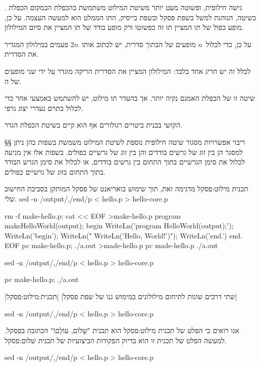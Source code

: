 גישה חילופית, ופשוטה מעט יותר משיטת המילוט משתמשת בהכפלת ה במקום הכפלת
. בשיטה, הנוהגת למשל בשפת פסקל ובשפת בייסיק,
התו הממלט הוא למעשה ה עצמה. על כן, מופע כפול של תו ה מציין תו זה כפשוטו ורק מופע בודד של תו ה מציין את
סיום המילולון.

על כן, כדי לכלול~$n$ מופעים של ה בתוך סדרית, יש לכתוב
אותו~$2n$ פעמים במילולון המגדיר את הסדרית.

לכלל זה יש חריג אחד בלבד:
המילולון המציין את הסדרית הריקה מוגדר על ידי שני מופעים של ה.

שיטה זו של הכפלת ה אמנם נקיה יותר, אך בהעדר תו מילוט, יש
להשתמש באמצעי אחר כדי לכלול ב תוים נעדרי יצוג גרפי.

הקושי בבנית ביטויים רגולורים אף הוא קיים בשיטת הכפלת הגדר.

§§ ריבוי אפשרויות מסגור
שיטה חילופית נוספת לשיטת המילוט משמשת בשפות בהן ניתן למסגר  הן בין זוג
של גרשים בודדים והן בין זוג של גרשיים כפולים. בשפות אלו אין מניעה לכלול את
סימן הגרשיים בתוך  התחום בין גרשים בודדים, או לכלול את סימן הגרש הבודד
בתוך  התחום בזוג של גרשיים כפולים.

 תכנית מילוט:פסקל מדגימה זאת, תוך שימוש בואריאנט של פסקל המותקן בסביבת
החישוב שלי.
\bash
sed -n /output/,/end/p < hello.p > hello-core.p
\END

\bash
rm -f make-hello.p; cat << EOF >make-hello.p
program makeHelloWorld(output);
begin
  WriteLn('program HelloWorld(output);');
  WriteLn('begin');
  WriteLn(" WriteLn('Hello, World!')");
  WriteLn('end.')
end.
EOF
pc make-hello.p; ./a.out >made-hello.p
pc made-hello.p
./a.out
\END

\bash
sed -n /output/,/end/p < hello.p > hello-core.p
\END

\begin{תכנית}
\setLTR

\begin{Output}
\bash[stdout]
pc make-hello.p; ./a.out
\END
\end{Output}\setRTL
{}|שתי דרכים שונות לתיחום מילולונים במימוש גנו של שפת פסקל|
|תכנית:מילוט:פסקל|
\end{תכנית}

\bash
sed -n /output/,/end/p < hello.p > hello-core.p
\END

אנו רואים כי הפלט של  תכנית מילוט:פסקל הוא תכנית "שָׁלוֹם, עוֹלָם!" הכתובה
בפסקל. למעשה הפלט של תכנית זו הוא בדיוק הפקודות הביצועיות של  תכנית
שלום:פסקל.

\bash
sed -n /output/,/end/p < hello.p > hello-core.p
\END

